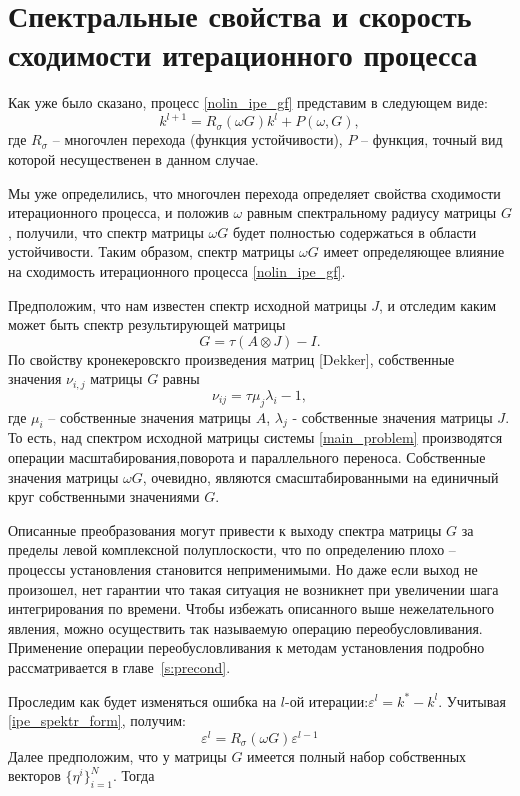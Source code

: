 \documentclass[a4paper,14pt]{extreport}
\begin{document}
  \section{Спектральные свойства и скорость сходимости итерационного процесса}
  \label{s:spectral_speed} 
Как уже было сказано, процесс \eqref{nolin_ipe_gf} представим в следующем виде:
	\begin{equation}
	\label{ipe_spektr_form}
	k^{l+1} = R_\sigma(\omega G)k^l+P(\omega, G),
	\end{equation}
где $R_\sigma$ -- многочлен перехода (функция устойчивости),  $P$ -- функция, точный вид которой несущественен в данном случае.
	
	Мы уже определились, что многочлен перехода определяет свойства сходимости итерационного процесса, и положив $\omega$ равным спектральному радиусу матрицы $G$, получили, что спектр матрицы $\omega G$ будет полностью содержаться в области устойчивости. Таким образом, спектр матрицы $\omega G$ имеет определяющее влияние на сходимость итерационного процесса \eqref{nolin_ipe_gf}.

Предположим, что нам известен спектр исходной матрицы $J$, и отследим каким может быть спектр результирующей матрицы
	$$G = \tau(A\otimes J) - I.$$
По свойству кронекеровскго произведения матриц [Dekker], собственные значения $\nu_{i,j}$ матрицы $G$ равны
	\begin{equation}\label{spektrG}
	\nu_{ij} = \tau \mu_j \lambda_i - 1,
	\end{equation}
где $\mu_i$ -- собственные значения матрицы $A$, $\lambda_j$ - собственные значения матрицы $J$. То есть, над  спектром исходной матрицы системы \eqref{main_problem} производятся операции масштабирования,поворота и параллельного переноса. Собственные значения матрицы $\omega G$, очевидно, являются смасштабированными на единичный круг собственными значениями  $G$. 

Описанные преобразования могут привести к выходу спектра матрицы $G$ за пределы левой комплексной полуплоскости, что по определению плохо – процессы установления становится неприменимыми. Но даже если выход не произошел, нет гарантии что такая ситуация не возникнет при увеличении шага интегрирования по
времени. Чтобы избежать описанного выше нежелательного явления, можно осуществить так называемую операцию переобусловливания. Применение операции переобусловливания к методам установления подробно рассматривается  в главе~\ref{s:precond}.

Проследим как будет изменяться ошибка на $l$-ой итерации:$\varepsilon^l= k^* - k^l$. Учитывая \eqref{ipe_spektr_form}, получим:
	$$\varepsilon^l = R_\sigma (\omega G)\varepsilon^{l-1}$$
Далее предположим, что у матрицы $G$ имеется полный набор собственных векторов $\{\eta^i\}_{i=1}^N$. Тогда
\end{document}
